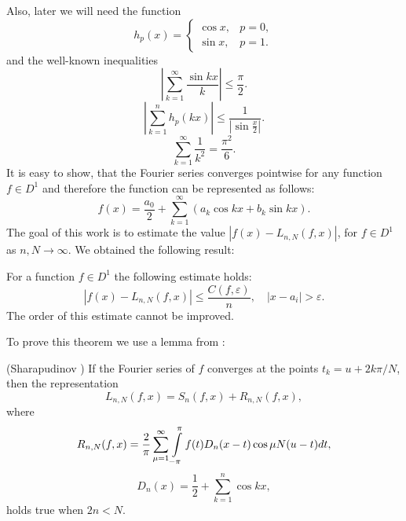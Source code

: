 Also, later we will need the function
\begin{equation*} \label{h_func_introduction}
h_{p}(x)=\begin{cases}
\cos x, & p=0,\\
\sin x, & p=1.
\end{cases}
\end{equation*}
and the well-known inequalities
\begin{equation} \label{sinkx_k_inequality}
\left|\sum_{k=1}^{\infty} \frac{\sin kx}{k}\right| \leq \frac{\pi}{2}.
\end{equation}
\begin{equation} \label{wk_sinkx_k}
\left|\sum_{k=1}^{n}h_{p}(kx)\right|\leq\frac{1}{\left|\sin\frac{x}{2}\right|}.
\end{equation}
\begin{equation} \label{wk_sum_1_k2}
\sum_{k=1}^{\infty} \frac{1}{k^2} = \frac{\pi^2}{6}.
\end{equation}
It is easy to show, that the Fourier series converges pointwise for any function $f \in D^1$ and therefore the function can be represented as follows:
\begin{equation*}
f(x) = \frac{a_0}{2} + \sum_{k=1}^{\infty} \left(a_k \cos kx + b_k \sin kx\right).
\end{equation*}	
The goal of this work is to estimate the value $\left| f(x) - L_{n,N}(f,x) \right|$, for $f \in D^1$ as $n, N \rightarrow \infty$. We obtained the following result:
\begin{theorem}\label{theorem}
	For a function $f \in D^1$ the following estimate holds:
	\begin{equation}\label{theorem_result}
	\left| f(x) - L_{n,N}(f,x) \right| \leq \frac{C(f,\varepsilon)}{n}, \quad |x - a_i| > \varepsilon.
	\end{equation}
	The order of this estimate cannot be improved.
\end{theorem}
To prove this theorem we use a lemma from \cite{shii-1983}:
\begin{lemma}\label{shii_lemma}
	(Sharapudinov \cite{shii-1983}) If the Fourier series of $f$ converges
	at the points $t_{k}=u+2k\pi/N$, then the representation 
	\[
	L_{n,N}(f,x)=S_{n}(f,x)+R_{n,N}(f,x),
	\]
	where 
	\begin{equation}
	R_{n,N}(f,x)=\frac{2}{\pi}\sum\limits_{\mu=1}^{\infty}\intop_{-\pi}^{\pi}
	f(t)D_{n}(x-t)\cos\mu N(u-t)dt,\label{eq:RnFormula}
	\end{equation}
	\begin{equation}
	D_n(x) = \frac{1}{2} + \sum_{k=1}^{n} \cos kx, \label{kernel}
	\end{equation}
	holds true when $2n<N$.
\end{lemma}
